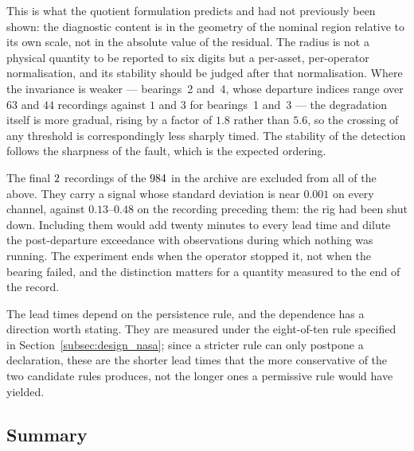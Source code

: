 \documentclass[a4paper]{cas-sc}
\begin{document}
This is what the quotient formulation predicts and had not previously been
shown: the diagnostic content is in the geometry of the nominal region
relative to its own scale, not in the absolute value of the residual. The
radius is not a physical quantity to be reported to six digits but a
per-asset, per-operator normalisation, and its stability should be judged
after that normalisation. Where the invariance is weaker --- bearings~2 and~4,
whose departure indices range over \(63\) and \(44\) recordings against \(1\)
and \(3\) for bearings~1 and~3 --- the degradation itself is more gradual,
rising by a factor of \(1.8\) rather than \(5.6\), so the crossing of any
threshold is correspondingly less sharply timed. The stability of the
detection follows the sharpness of the fault, which is the expected ordering.

The final \(2\) recordings of the \(984\) in the
archive are excluded from all of the above. They carry a signal whose standard
deviation is near \(0.001\) on every channel, against \(0.13\)--\(0.48\)
on the recording preceding them: the rig had been shut down. Including them
would add twenty minutes to every lead time and dilute the post-departure
exceedance with observations during which nothing was running. The experiment
ends when the operator stopped it, not when the bearing failed, and the
distinction matters for a quantity measured to the end of the record.

The lead times depend on the persistence rule, and the dependence has a
direction worth stating. They are measured under the eight-of-ten rule
specified in Section~\ref{subsec:design_nasa}; since a stricter rule can only
postpone a declaration, these are the shorter lead times that the more
conservative of the two candidate rules produces, not the longer ones a
permissive rule would have yielded.

\subsection{Summary}
\label{subsec:results_summary}
\end{document}
